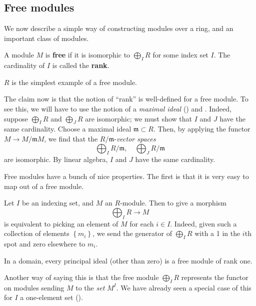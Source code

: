 \subsection{Free modules}

We now describe a simple way of constructing modules over a ring, and an
important class of modules.

\begin{definition} 
A module $M$ is \textbf{free} if it is isomorphic to $\bigoplus_I R$ for some
index set $I$. The cardinality of $I$ is called the \textbf{rank}.
\end{definition} 

\begin{example} 
$R$ is the simplest example of a free module.
\end{example} 

The claim now is that the notion of ``rank'' is well-defined for a free
module. To see this, we will have to use the notion 
of a \emph{maximal ideal} () and
.
Indeed, suppose
$\bigoplus_I R$ and $\bigoplus_J R$ are isomorphic; we must show that $I$ and
$J$ have the same cardinality. Choose a maximal ideal $\mathfrak{m}
\subset R$. Then, by applying the functor $M \to
M/\mathfrak{m}M$, we find that the $R/\mathfrak{m}$-\emph{vector spaces}
\[ \bigoplus_I R/\mathfrak{m}, \quad \bigoplus_J R/\mathfrak{m}  \]
are isomorphic. By linear algebra, $I$ and $J$ have the same cardinality. 


Free modules have a bunch of nice properties. The first is that it is very
easy to map out of a free module.
\begin{example} 
Let $I$ be an indexing set, and $M$ an $R$-module. Then to give a morphism
\[ \bigoplus_I R \to M  \]
is equivalent to picking an element of $M$ for each $i \in I$. Indeed, given
such a collection of elements $\left\{m_i\right\}$, we send the generator of $\bigoplus_I R$ with a 1
in the $i$th spot and zero elsewhere to $m_i$.
\end{example}

\begin{example} 
In a domain, every principal ideal (other than zero) is a free module of rank
one.
\end{example} 

Another way of saying this is that the free module $\bigoplus_I R$ represents
the functor on modules sending $M$ to the \emph{set} $ M^I$. We have already seen a special case of this for $I$ a
one-element set ().

